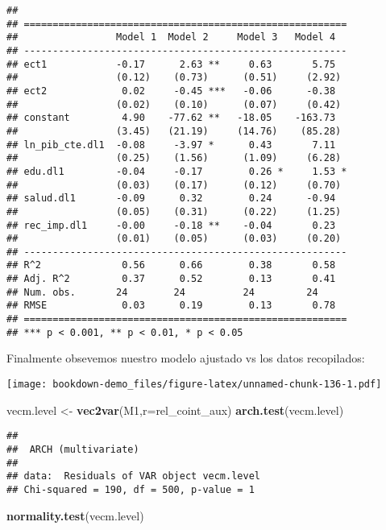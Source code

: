 \documentclass[]{book}
\newenvironment{Shaded}{\begin{snugshade}}{\end{snugshade}}
\newcommand{\KeywordTok}[1]{\textcolor[rgb]{0.13,0.29,0.53}{\textbf{#1}}}
\newcommand{\DataTypeTok}[1]{\textcolor[rgb]{0.13,0.29,0.53}{#1}}
\newcommand{\StringTok}[1]{\textcolor[rgb]{0.31,0.60,0.02}{#1}}
\newcommand{\NormalTok}[1]{#1}
\theoremstyle{definition}
\theoremstyle{definition}
\theoremstyle{definition}
\theoremstyle{remark}
\begin{document}
\begin{verbatim}
## 
## ========================================================
##                 Model 1  Model 2     Model 3   Model 4  
## --------------------------------------------------------
## ect1            -0.17      2.63 **     0.63       5.75  
##                 (0.12)    (0.73)      (0.51)     (2.92) 
## ect2             0.02     -0.45 ***   -0.06      -0.38  
##                 (0.02)    (0.10)      (0.07)     (0.42) 
## constant         4.90    -77.62 **   -18.05    -163.73  
##                 (3.45)   (21.19)     (14.76)    (85.28) 
## ln_pib_cte.dl1  -0.08     -3.97 *      0.43       7.11  
##                 (0.25)    (1.56)      (1.09)     (6.28) 
## edu.dl1         -0.04     -0.17        0.26 *     1.53 *
##                 (0.03)    (0.17)      (0.12)     (0.70) 
## salud.dl1       -0.09      0.32        0.24      -0.94  
##                 (0.05)    (0.31)      (0.22)     (1.25) 
## rec_imp.dl1     -0.00     -0.18 **    -0.04       0.23  
##                 (0.01)    (0.05)      (0.03)     (0.20) 
## --------------------------------------------------------
## R^2              0.56      0.66        0.38       0.58  
## Adj. R^2         0.37      0.52        0.13       0.41  
## Num. obs.       24        24          24         24     
## RMSE             0.03      0.19        0.13       0.78  
## ========================================================
## *** p < 0.001, ** p < 0.01, * p < 0.05
\end{verbatim}

Finalmente obsevemos nuestro modelo ajustado vs los datos recopilados:

\texttt{[image: bookdown-demo\_files/figure-latex/unnamed-chunk-136-1.pdf]}

\begin{Shaded}
\begin{Highlighting}[]
\NormalTok{vecm.level <-}\StringTok{ }\KeywordTok{vec2var}\NormalTok{(M1,}\DataTypeTok{r=}\NormalTok{rel_coint_aux)}
\KeywordTok{arch.test}\NormalTok{(vecm.level)}
\end{Highlighting}
\end{Shaded}

\begin{verbatim}
## 
##  ARCH (multivariate)
## 
## data:  Residuals of VAR object vecm.level
## Chi-squared = 190, df = 500, p-value = 1
\end{verbatim}

\begin{Shaded}
\begin{Highlighting}[]
\KeywordTok{normality.test}\NormalTok{(vecm.level)}
\end{Highlighting}
\end{Shaded}
\end{document}
